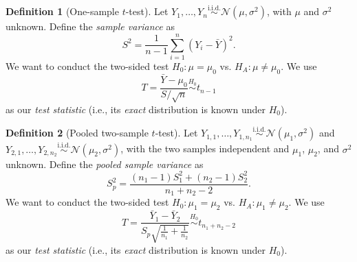\documentclass[12pt,oneside]{article}
\newcommand{\N}{\mathcal{N}}
\newcommand{\simiid}{\overset{\text{i.i.d.}}{\sim}}
\newcommand{\simnull}{\overset{H_0}{\sim}}
\theoremstyle{definition}
\newtheorem{definition}{Definition}
\theoremstyle{remark}
\begin{document}
\begin{definition}[One-sample $t$-test]
Let $Y_{1}, \ldots, Y_{n} \simiid \N(\mu, \sigma^2)$, with $\mu$ and $\sigma^2$ unknown. Define the \textit{sample variance} as \[S^2 = \frac{1}{n - 1} \sum_{i = 1}^{n} (Y_{i} - \bar{Y})^2.\] We want to conduct the two-sided test $H_{0}: \mu = \mu_{0}$ vs. $H_{A}: \mu \neq \mu_{0}$. We use \[T = \frac{\bar{Y} - \mu_{0}}{S / \sqrt{n}} \simnull t_{n - 1}\] as our \textit{test statistic} (i.e., its \textit{exact} distribution is known under $H_0$).
\end{definition}

\begin{definition}[Pooled two-sample $t$-test]
Let $Y_{1, 1}, \ldots, Y_{1, n_1} \simiid \N(\mu_{1}, \sigma^2)$ and $Y_{2, 1}, \ldots, Y_{2, n_2} \simiid \N(\mu_{2}, \sigma^2)$, with the two samples independent and $\mu_{1}$, $\mu_{2}$, and $\sigma^2$ unknown. Define the \textit{pooled sample variance} as \[S^2_p = \frac{(n_1 - 1) S^2_1 + (n_2 - 1) S^2_2}{n_1 + n_2 - 2}.\] We want to conduct the two-sided test $H_{0}: \mu_1 = \mu_2$ vs. $H_{A}: \mu_1 \neq \mu_2$. We use \[T = \frac{\bar{Y}_{1} - \bar{Y}_{2}}{S_p \sqrt{\frac{1}{n_1} + \frac{1}{n_2}}} \simnull t_{n_1 + n_2 - 2}\] as our \textit{test statistic} (i.e., its \textit{exact} distribution is known under $H_0$).
\end{definition}
\end{document}
